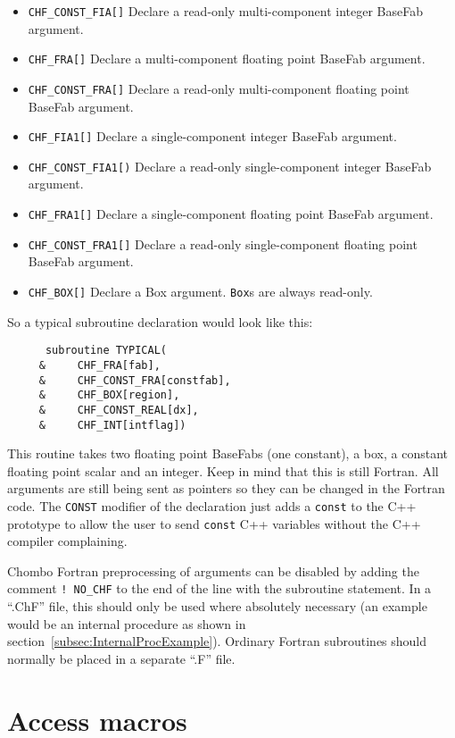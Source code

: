 \begin{itemize}
\item {\tt CHF\_CONST\_FIA[\argv]} Declare a read-only multi-component integer BaseFab argument.
\item {\tt CHF\_FRA[\argv]} Declare a multi-component floating point BaseFab argument.
\item {\tt CHF\_CONST\_FRA[\argv]} Declare a read-only multi-component floating point BaseFab argument.
\item {\tt CHF\_FIA1[\argv]} Declare a single-component integer BaseFab argument.
\item {\tt CHF\_CONST\_FIA1[\argv)} Declare a read-only single-component integer BaseFab argument.
\item {\tt CHF\_FRA1[\argv]} Declare a single-component floating point BaseFab argument.
\item {\tt CHF\_CONST\_FRA1[\argv]} Declare a read-only single-component floating point BaseFab argument.
\item {\tt CHF\_BOX[\argv]} Declare a Box argument. {\tt Box}s are always read-only.  
\end{itemize}
So a typical subroutine declaration would look like this:
\begin{verbatim}
      subroutine TYPICAL(
     &     CHF_FRA[fab],
     &     CHF_CONST_FRA[constfab],
     &     CHF_BOX[region],
     &     CHF_CONST_REAL[dx],
     &     CHF_INT[intflag])
\end{verbatim}
This routine takes two floating point BaseFabs (one constant), a box,
a constant floating point scalar and an integer.  Keep in mind that 
this is still Fortran.  All arguments are still being sent as 
pointers so they can be changed in the Fortran code.  The {\tt CONST}
modifier of the declaration just adds a {\tt const} to the C++
prototype to allow the user to send {\tt const} 
C++ variables without the C++ compiler complaining.

Chombo Fortran preprocessing of arguments can be disabled by adding the comment {\tt !~NO\_CHF} to the end of the line with the subroutine statement.  In a ``.ChF'' file, this should only be used where absolutely necessary (an example would be an internal procedure as shown in section~\ref{subsec:InternalProcExample}).  Ordinary Fortran subroutines should normally be placed in a separate ``.F'' file.

\section{Access macros}

